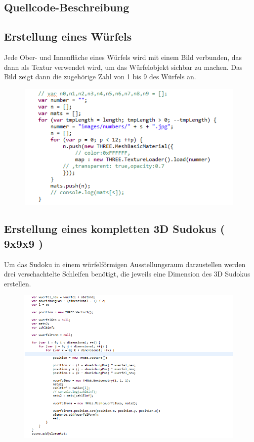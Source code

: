 \documentclass[a4paper,12pt]{scrreprt}
\begin{document}
	\subsection{Quellcode-Beschreibung}
	\subsection{Erstellung eines W\"urfels}
	Jede Ober- und Innenfl\"ache eines W\"urfels wird mit einem Bild verbunden, das dann als Textur verwendet wird,
	um das W\"urfelobjekt sichbar zu machen. Das Bild zeigt dann die zugeh\"orige Zahl von 1 bis 9 des W\"urfels an.
	\begin{figure}[h]
		\includegraphics[scale=0.6]{pictures/createCube_sourcecode}
	\end{figure}
	
	\subsection{Erstellung eines kompletten 3D Sudokus ( 9x9x9 )}
	Um das Sudoku in einem w\"urfelf\"ormigen Ausstellungsraum darzustellen werden drei verschachtelte Schleifen ben\"otigt,
	die jeweils eine Dimension des 3D Sudokus erstellen.
	\begin{figure}[h]
		\includegraphics[scale=0.6]{pictures/createSudoku_sourcecode}
	\end{figure}
	
\end{document}
